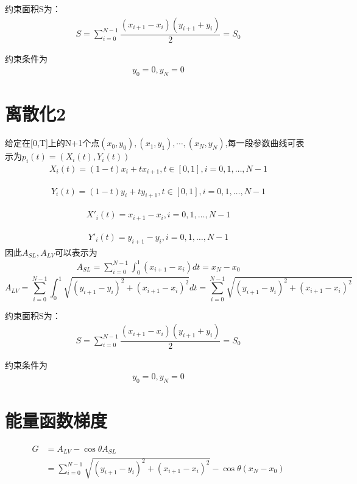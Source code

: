\documentclass{article}
\begin{document}
	约束面积S为：
	\begin{align}
	S=\sum_{i=0}^{N-1}\dfrac{(x_{i+1}-x_{i})(y_{i+1}+y_{i})}{2}=S_{0}
	\end{align}
	
	约束条件为
	\begin{align}
	y_{0}=0,y_{N}=0
	\end{align}
	
\section{离散化2}
	给定在[0,T]上的N+1个点$(x_{0},y_{0}),(x_{1},y_{1}),\cdots,(x_{N},y_{N})$,每一段参数曲线可表示为$p_{i}(t)=(X_{i}(t),Y_{i}(t))$
\begin{align}
X_{i}(t)=(1-t)x_{i}+tx_{i+1}, t \in [0,1],i=0,1,\dots,N-1
\end{align}

\begin{align}
Y_{i}(t)=(1-t)y_{i}+ty_{i+1}, t \in [0,1],i=0,1,\dots,N-1
\end{align}

\begin{align}
X'_{i}(t)=x_{i+1}-x_{i},i=0,1,\dots,N-1
\end{align}

\begin{align}
Y'_{i}(t)=y_{i+1}-y_{i},i=0,1,\dots,N-1
\end{align}
因此$ A_{SL},A_{LV}$可以表示为
\begin{align}
A_{SL}=\sum_{i=0}^{N-1}\int_{0}^{1}(x_{i+1}-x_{i})dt=x_{N}-x_{0}
\end{align}	
\begin{equation}
A_{LV}=\sum_{i=0}^{N-1}\int_{0}^{1}\sqrt{(y_{i+1}-y_{i} )^2+(x_{i+1}-x_{i})^2}dt=\sum_{i=0}^{N-1}\sqrt{(y_{i+1}-y_{i} )^2+(x_{i+1}-x_{i})^2}
\end{equation}

	约束面积S为：
\begin{align}
S=\sum_{i=0}^{N-1}\dfrac{(x_{i+1}-x_{i})(y_{i+1}+y_{i})}{2}=S_{0}
\end{align}

约束条件为
\begin{align}
y_{0}=0,y_{N}=0
\end{align}
\setlength{\parindent}{2em}

\section{能量函数梯度}
\begin{align*}
G &= A_{LV}-\cos\theta A_{SL} \\
  &=\sum_{i=0}^{N-1}\sqrt{(y_{i+1}-y_{i} )^2+(x_{i+1}-x_{i})^2} - \cos \theta (x_{N}-x_{0})
\end{align*}
\end{document}
